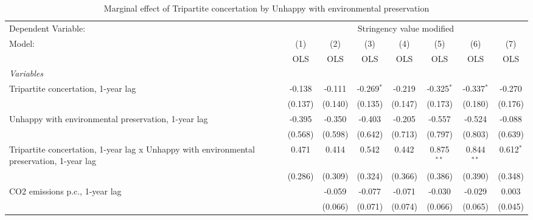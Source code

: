 
\begin{table}[htbp]
   \caption{Marginal effect of Tripartite concertation by Unhappy with environmental preservation}
   \centering
   \begin{tabular}{lccccccc}
      \toprule
      Dependent Variable: & \multicolumn{7}{c}{Stringency value modified}\\
      Model:                                                                                    & (1)     & (2)     & (3)          & (4)           & (5)           & (6)           & (7)\\  
                                                                                                &  OLS    & OLS     & OLS          & OLS           & OLS           & OLS           & OLS\\  
      \midrule
      \emph{Variables}\\
      Tripartite concertation, 1-year lag                                                       & -0.138  & -0.111  & -0.269$^{*}$ & -0.219        & -0.325$^{*}$  & -0.337$^{*}$  & -0.270\\   
                                                                                                & (0.137) & (0.140) & (0.135)      & (0.147)       & (0.173)       & (0.180)       & (0.176)\\   
      Unhappy with environmental preservation, 1-year lag                                       & -0.395  & -0.350  & -0.403       & -0.205        & -0.557        & -0.524        & -0.088\\   
                                                                                                & (0.568) & (0.598) & (0.642)      & (0.713)       & (0.797)       & (0.803)       & (0.639)\\   
      Tripartite concertation, 1-year lag x Unhappy with environmental preservation, 1-year lag & 0.471   & 0.414   & 0.542        & 0.442         & 0.875$^{**}$  & 0.844$^{**}$  & 0.612$^{*}$\\   
                                                                                                & (0.286) & (0.309) & (0.324)      & (0.366)       & (0.386)       & (0.390)       & (0.348)\\   
      CO2 emissions p.c., 1-year lag                                                            &         & -0.059  & -0.077       & -0.071        & -0.030        & -0.029        & 0.003\\   
                                                                                                &         & (0.066) & (0.071)      & (0.074)       & (0.066)       & (0.065)       & (0.045)\\   

\end{tabular}
\end{table}
